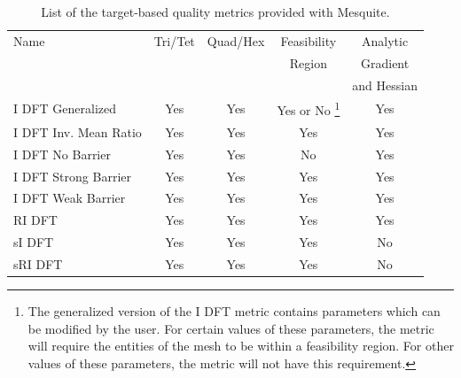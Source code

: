 \begin{table}[!hp]
\begin{center}
\begin{minipage}[h]{\textwidth}
\renewcommand{\thempfootnote}{\arabic{mpfootnote}}
\begin{tabular}{|l|c|c|c|c|}
\hline
Name                   & Tri/Tet & Quad/Hex  & Feasibility & Analytic  \\
                       &         &           & Region      & Gradient  \\
                       &         &           &             & and Hessian   \\  
\hline
I DFT Generalized      & Yes     & Yes       & Yes or No
\footnote{The generalized version
of the I DFT metric contains parameters which can be modified by the user.  For certain
values of these parameters, the metric will require the entities of the mesh to be within a
feasibility region.  For other values of these parameters, the metric will not have this
requirement.}
                                                           & Yes       \\
I DFT Inv. Mean Ratio  & Yes     & Yes       & Yes         & Yes       \\
I DFT No Barrier       & Yes     & Yes       & No          & Yes       \\
I DFT Strong Barrier   & Yes     & Yes       & Yes         & Yes       \\
I DFT Weak Barrier     & Yes     & Yes       & Yes         & Yes       \\
RI DFT                 & Yes     & Yes       & Yes         & Yes       \\
sI DFT                 & Yes     & Yes       & Yes         & No        \\
sRI DFT                & Yes     & Yes       & Yes         & No        \\
\hline
\end{tabular}
\caption{List of the target-based quality metrics provided with Mesquite.}
\label{Corner Metrics}
\end{minipage}
\end{center}
\end{table}

